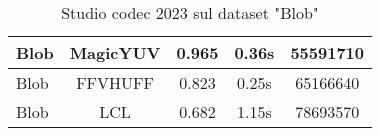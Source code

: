 \begin{table}[ht]
\begin{tabular}{|l|c|c|c|c|}
Blob                  & MagicYUV  & 0.965                                                            & 0.36s                                                          & 55591710                                                     \\ \hline
Blob                  & FFVHUFF   & 0.823                                                            & 0.25s                                                          & 65166640                                                     \\ \hline
Blob                  & LCL       & 0.682                                                            & 1.15s                                                          & 78693570                                                     \\ \hline
\end{tabular}
\caption{Studio codec 2023 sul dataset "Blob"}
\end{table}


